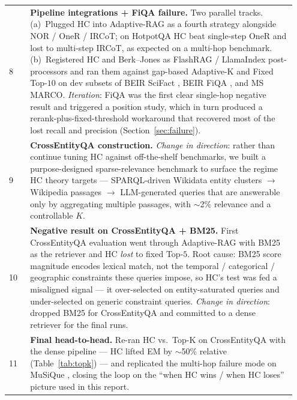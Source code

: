 \documentclass[letterpaper]{article}
\begin{document}
\begin{center}
\begin{tabular}{p{0.07\linewidth}p{0.88\linewidth}}
8   & \textbf{Pipeline integrations + FiQA failure.} Two parallel
tracks. (a)~Plugged HC into Adaptive-RAG as a fourth strategy
alongside NOR / OneR / IRCoT; on HotpotQA HC beat single-step OneR
and lost to multi-step IRCoT, as expected on a multi-hop benchmark.
(b)~Registered HC and Berk--Jones \cite{berkjones1979} as
FlashRAG / LlamaIndex post-processors and ran them against
gap-based Adaptive-K and Fixed Top-$10$ on dev subsets of BEIR
SciFact \cite{thakur2021beir,wadden2020scifact}, BEIR FiQA
\cite{thakur2021beir}, and MS MARCO. \emph{Iteration}: FiQA was
the first clear single-hop negative result and triggered a position
study, which in turn produced a rerank-plus-fixed-threshold
workaround that recovered most of the lost recall and precision
(Section~\ref{sec:failure}). \\
9   & \textbf{CrossEntityQA construction.} \emph{Change in
direction}: rather than continue tuning HC against off-the-shelf
benchmarks, we built a purpose-designed sparse-relevance benchmark
to surface the regime HC theory targets --- SPARQL-driven Wikidata
entity clusters $\to$ Wikipedia passages $\to$ LLM-generated queries
that are answerable only by aggregating multiple passages, with
$\sim$2\% relevance and a controllable $K$. \\
10  & \textbf{Negative result on CrossEntityQA + BM25.} First
CrossEntityQA evaluation went through Adaptive-RAG with BM25 as the
retriever and HC \emph{lost} to fixed Top-$5$. Root cause: BM25
score magnitude encodes lexical match, not the temporal /
categorical / geographic constraints these queries impose, so HC's
test was fed a misaligned signal --- it over-selected on
entity-saturated queries and under-selected on generic constraint
queries. \emph{Change in direction}: dropped BM25 for
CrossEntityQA and committed to a dense retriever for the final
runs. \\
11  & \textbf{Final head-to-head.} Re-ran HC vs.\ Top-K on
CrossEntityQA with the dense pipeline --- HC lifted EM by $\sim$50\%
relative (Table~\ref{tab:topk}) --- and replicated the multi-hop
failure mode on MuSiQue \cite{trivedi2022musique}, closing the
loop on the ``when HC wins / when HC loses'' picture used in this
report. \\
\hline
\end{tabular}
\end{center}
\end{document}
